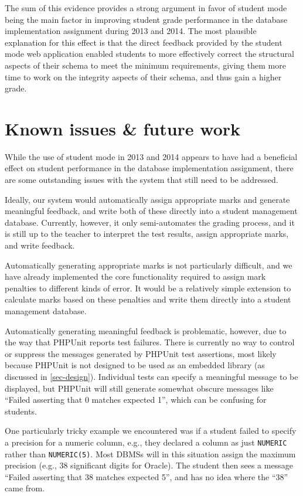 \documentclass[sigconf, review, anonymous, capitalise]{acmart}
\begin{document}
The sum of this evidence provides a strong argument in favor of student mode being the main factor in improving student grade performance in the database implementation assignment during 2013 and 2014. The most plausible explanation for this effect is that the direct feedback provided by the student mode web application enabled students to more effectively correct the structural aspects of their schema to meet the minimum requirements, giving them more time to work on the integrity aspects of their schema, and thus gain a higher grade.


\section{Known issues \& future work}
\label{sec-issues}

While the use of student mode in 2013 and 2014 appears to have had a beneficial effect on student performance in the database implementation assignment, there are some outstanding issues with the system that still need to be addressed.

Ideally, our system would automatically assign appropriate marks and generate meaningful feedback, and write both of these directly into a student management database. Currently, however, it only semi-automates the grading process, and it is still up to the teacher to interpret the test results, assign appropriate marks, and write feedback.

Automatically generating appropriate marks is not particularly difficult, and we have already implemented the core functionality required to assign mark penalties to different kinds of error. It would be a relatively simple extension to calculate marks based on these penalties and write them directly into a student management database.

Automatically generating meaningful feedback is problematic, however, due to the way that PHPUnit reports test failures. There is currently no way to control or suppress the messages generated by PHPUnit test assertions, most likely because PHPUnit is not designed to be used as an embedded library (as discussed in \cref{sec-design}). Individual tests can specify a meaningful message to be displayed, but PHPUnit will still generate somewhat obscure messages like ``Failed asserting that 0 matches expected 1'', which can be confusing for students.

One particularly tricky example we encountered was if a student failed to specify a precision for a numeric column, e.g., they declared a column as just \texttt{NUMERIC} rather than \texttt{NUMERIC(5)}. Most DBMSs will in this situation assign the maximum precision (e.g., 38 significant digits for Oracle). The student then sees a message ``Failed asserting that 38 matches expected 5'', and has no idea where the ``38'' came from.
\end{document}

